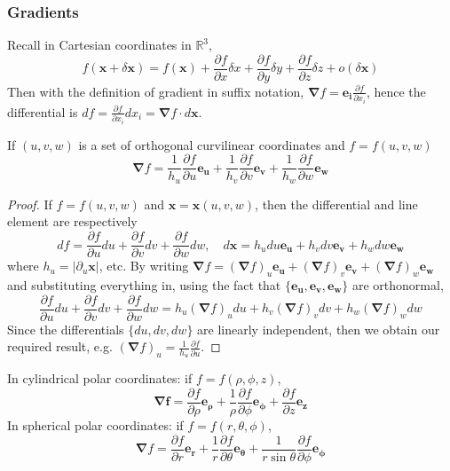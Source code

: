 \documentclass[a4paper]{article}
\begin{document}
\subsubsection*{Gradients}
Recall in Cartesian coordinates in $\mathbb{R}^3$,
$$f(\mathbf{x}+\delta\mathbf{x})=f(\mathbf{x})+\frac{\partial f}{\partial x}\delta x+\frac{\partial f}{\partial y}\delta y+\frac{\partial f}{\partial z}\delta z+o(\delta\mathbf{x})$$
Then with the definition of gradient in suffix notation, $\boldsymbol{\nabla}f=\mathbf{e_i}\frac{\partial f}{\partial x_i}$, hence the differential is $df=\frac{\partial f}{\partial x_i}dx_i=\boldsymbol{\nabla}f\cdot d\mathbf{x}$.
\begin{prop}
If $(u,v,w)$ is a set of orthogonal curvilinear coordinates and $f=f(u,v,w)$
\begin{equation}
  \boldsymbol{\nabla}f=\frac{1}{h_u}\frac{\partial f}{\partial u}\mathbf{e_u}+\frac{1}{h_v}\frac{\partial f}{\partial v}\mathbf{e_v}+\frac{1}{h_w}\frac{\partial f}{\partial w}\mathbf{e_w}\tag{1.14}  
\end{equation}
\end{prop}
\begin{proof}
If $f=f(u,v,w)$ and $\mathbf{x}=\mathbf{x}(u,v,w)$, then the differential and line element are respectively
$$df=\frac{\partial f}{\partial u}du+\frac{\partial f}{\partial v}dv+\frac{\partial f}{\partial w}dw,\quad d\mathbf{x}=h_udu\mathbf{e_u}+h_vdv\mathbf{e_v}+h_wdw\mathbf{e_w}$$
where $h_u=|\partial_u\mathbf{x}|$, etc. By writing $\boldsymbol{\nabla}f=(\boldsymbol{\nabla}f)_u\mathbf{e_u}+(\boldsymbol{\nabla}f)_v\mathbf{e_v}+(\boldsymbol{\nabla}f)_w\mathbf{e_w}$ and substituting everything in, using the fact that $\{\mathbf{e_u},\mathbf{e_v},\mathbf{e_w}\}$ are orthonormal,
$$\frac{\partial f}{\partial u}du+\frac{\partial f}{\partial v}dv+\frac{\partial f}{\partial w}dw=h_u(\boldsymbol{\nabla}f)_udu+h_v(\boldsymbol{\nabla}f)_vdv+h_w(\boldsymbol{\nabla}f)_wdw$$
Since the differentials $\{du,dv,dw\}$ are linearly independent, then we obtain our required result, e.g. $(\boldsymbol{\nabla}f)_u=\frac{1}{h_u}\frac{\partial f}{\partial u}$.
\end{proof}
\begin{eg}
In cylindrical polar coordinates: if $f=f(\rho,\phi,z)$,
$$\boldsymbol{\nabla f}=\frac{\partial f}{\partial\rho}\boldsymbol{e_\rho}+\frac{1}{\rho}\frac{\partial f}{\partial\phi}\boldsymbol{e_\phi}+\frac{\partial f}{\partial z}\mathbf{e_z}$$
In spherical polar coordinates: if $f=f(r,\theta,\phi)$,
$$\boldsymbol{\nabla}f=\frac{\partial f}{\partial r}\mathbf{e_r}+\frac{1}{r}\frac{\partial f}{\partial\theta}\boldsymbol{e_\theta}+\frac{1}{r\sin\theta}\frac{\partial f}{\partial\phi}\boldsymbol{e_\phi}$$
\end{eg}
\end{document}
